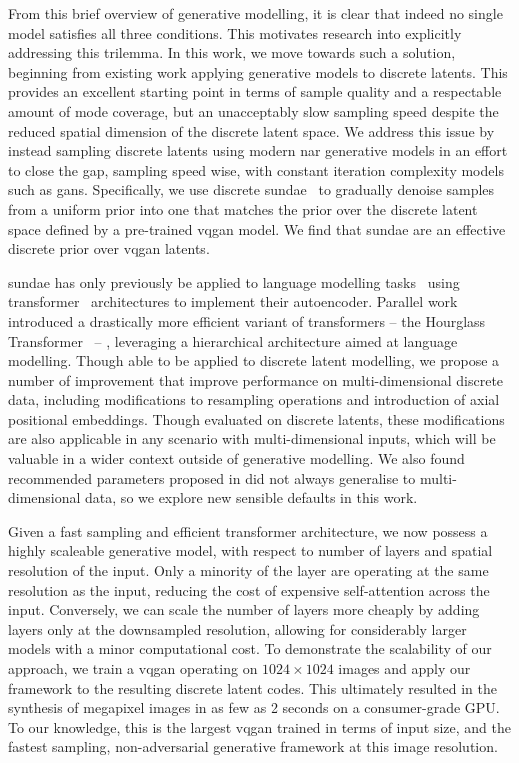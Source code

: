 From this brief overview of generative modelling, it is clear that indeed no
single model satisfies all three conditions. This motivates research into
explicitly addressing this trilemma. In this work, we move towards such a
solution, beginning from existing work applying generative models to discrete
latents. This provides an excellent starting point in terms of sample quality
and a respectable amount of mode coverage, but an unacceptably slow sampling
speed despite the reduced spatial dimension of the discrete latent space. We
address this issue by instead sampling discrete latents using modern \gls{nar}
generative models in an effort to close the gap, sampling speed wise, with
constant iteration complexity models such as \glspl{gan}. Specifically, we use
discrete \gls{sundae}~\cite{savinov2022stepunrolled} to gradually denoise
samples from a uniform prior into one that matches the prior over the discrete
latent space defined by a pre-trained \gls{vqgan} model. We find that
\gls{sundae} are an effective discrete prior over \gls{vqgan} latents.

\Gls{sundae} has only previously be applied to language modelling
tasks~\cite{savinov2022stepunrolled} using
transformer~\cite{vaswani2017attention} architectures to implement their
autoencoder. Parallel work introduced a drastically more efficient variant of
transformers -- the Hourglass Transformer~\cite{nawrot2021hierarchical} -- ,
leveraging a hierarchical architecture aimed at language modelling. Though able
to be applied to discrete latent modelling, we propose a number of improvement
that improve performance on multi-dimensional discrete data, including
modifications to resampling operations and introduction of axial positional
embeddings. Though evaluated on discrete latents, these modifications are also
applicable in any scenario with multi-dimensional inputs, which will be valuable
in a wider context outside of generative modelling. We also found recommended
parameters proposed in \citet{savinov2022stepunrolled} did not always generalise
to multi-dimensional data, so we explore new sensible defaults in this work.

Given a fast sampling and efficient transformer architecture, we now possess
a highly scaleable generative model, with respect to number of layers and
spatial resolution of the input. Only a minority of the layer are
operating at the same resolution as the input, reducing the cost of expensive
self-attention across the input. Conversely, we can scale the number of layers
more cheaply by adding layers only at the downsampled resolution, allowing for
considerably larger models with a minor computational cost. To demonstrate
the scalability of our approach, we train a \gls{vqgan} operating on $1024
\times 1024$ images and apply our framework to the resulting discrete latent
codes. This ultimately resulted in the synthesis of megapixel images in as few
as 2 seconds on a consumer-grade GPU. To our knowledge, this is the largest
\gls{vqgan} trained in terms of input size, and the fastest sampling,
non-adversarial generative framework at this image resolution.

